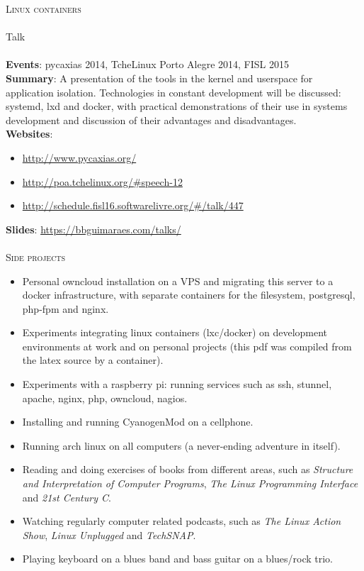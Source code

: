 \noindent
\textsc{\Large Linux containers} \\\\
Talk \\\\
\textbf{Events}: pycaxias 2014, TcheLinux Porto Alegre 2014, FISL 2015 \\
\textbf{Summary}:
    A presentation of the tools in the kernel and userspace for application
    isolation. Technologies in constant development will be discussed: systemd,
    lxd and docker, with practical demonstrations of their use in systems
    development and discussion of their advantages and disadvantages. \\
\textbf{Websites}:
\begin{itemize}
    \vspace{-2.5mm}
    \itemsep-1mm
    \item \url{http://www.pycaxias.org/}
    \item \url{http://poa.tchelinux.org/#speech-12}
    \item \url{http://schedule.fisl16.softwarelivre.org/#/talk/447}
    \vspace{-2.5mm}
\end{itemize}
\textbf{Slides}: \url{https://bbguimaraes.com/talks/} \\\\

\noindent
\textsc{\Large Side projects} \\
\begin{itemize}
    \vspace{-2.5mm}
    \itemsep-1mm
    \item Personal owncloud installation on a VPS and migrating this server to
        a docker infrastructure, with separate containers for the filesystem,
        postgresql, php-fpm and nginx.
    \item Experiments integrating linux containers (lxc/docker) on development
        environments at work and on personal projects (this pdf was compiled
        from the latex source by a container).
    \item Experiments with a raspberry pi: running services such as ssh,
        stunnel, apache, nginx, php, owncloud, nagios.
    \item Installing and running CyanogenMod on a cellphone.
    \item Running arch linux on all computers (a never-ending adventure in
        itself).
    \item Reading and doing exercises of books from different areas, such as
        \textit{Structure and Interpretation of Computer Programs}, \textit{The
        Linux Programming Interface} and \textit{21st Century C}.
    \item Watching regularly computer related podcasts, such as \textit{The
        Linux Action Show}, \textit{Linux Unplugged} and \textit{TechSNAP}.
    \item Playing keyboard on a blues band and bass guitar on a blues/rock
        trio.
\end{itemize}
